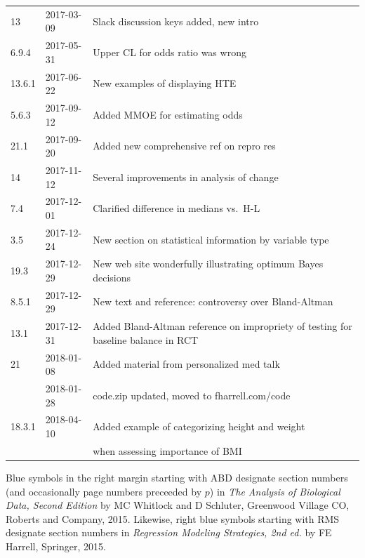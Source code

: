 \documentclass{report}
\begin{document}
\begin{center}
\begin{tabular}{lll}
13      & 2017-03-09 & Slack discussion keys added, new intro \\
6.9.4   & 2017-05-31 & Upper CL for odds ratio was wrong \\
13.6.1  & 2017-06-22 & New examples of displaying HTE \\
5.6.3   & 2017-09-12 & Added MMOE for estimating odds \\
21.1    & 2017-09-20 & Added new comprehensive ref on repro res \\
14      & 2017-11-12 & Several improvements in analysis of change\\
7.4     & 2017-12-01 & Clarified difference in medians vs.\ H-L\\
3.5     & 2017-12-24 & New section on statistical information by
                       variable type\\
19.3    & 2017-12-29 & New web site wonderfully illustrating optimum
                       Bayes decisions\\
8.5.1   & 2017-12-29 & New text and reference: controversy over
                       Bland-Altman\\
13.1    & 2017-12-31 & Added Bland-Altman reference on impropriety of
                       testing for baseline balance in RCT\\
21      & 2018-01-08 & Added material from personalized med talk\\
        & 2018-01-28 & code.zip updated, moved to fharrell.com/code\\
18.3.1  & 2018-04-10 & Added example of categorizing height and weight\\
        &            & when assessing importance of BMI
\hline
\end{tabular}\end{center}
\else
\fi

Blue symbols in the right margin starting with ABD designate
section numbers (and occasionally page numbers preceeded by $p$)
in \emph{The Analysis of Biological Data, Second Edition} by MC Whitlock and D
Schluter, Greenwood Village CO, Roberts and Company, 2015.  Likewise, right
blue symbols starting with RMS designate section numbers in \emph{Regression
Modeling Strategies, 2nd ed.} by FE Harrell, Springer, 2015.
\end{document}
